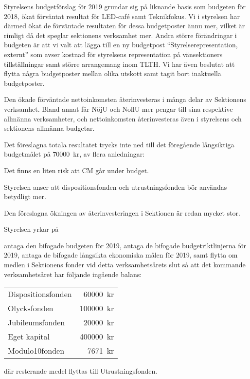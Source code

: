 \documentclass[../_main/handlingar.tex]{subfiles}
\begin{document}

Styrelsens budgetförslag för 2019 grundar sig på liknande basis som budgeten för 2018, ökat förväntat resultat för LED-café samt Teknikfokus. Vi i styrelsen har därmed ökat de förväntade resultaten för dessa budgetposter ännu mer, vilket är rimligt då det speglar sektionens verksamhet mer. Andra större förändringar i budgeten är att vi valt att lägga till en ny budgetpost ``Styrelserepresentation, externt'' som avser kostnad för styrelsens representation på vänsektioners tillställningar samt större arrangemang inom TLTH. Vi har även beslutat att flytta några budgetposter mellan olika utskott samt tagit bort inaktuella budgetposter. 

Den ökade förväntade nettoinkomsten återinvesteras i många delar av Sektionens verksamhet. Bland annat får NöjU och NollU mer pengar till sina respektive allmänna verksamheter, och nettoinkomsten återinvesteras även i styrelsens och sektionens allmänna budgetar.

Det föreslagna totala resultatet trycks inte ned till det föregående långsiktiga budgetmålet på \SI{70000}{kr}, av flera anledningar:
\begin{tightdashlist}
    \item Det finns en liten risk att CM går under budget.
    \item Styrelsen anser att dispositionsfonden och utrustningsfonden bör användas betydligt mer.
    \item Den föreslagna ökningen av återinvesteringen i Sektionen är redan mycket stor.
\end{tightdashlist}

Styrelsen yrkar på

\begin{attsatser}
    \att antaga den bifogade budgeten för 2019,
    \att antaga de bifogade budgetriktlinjerna för 2019,
    \att antaga de bifogade långsikta ekonomiska målen för 2019, samt
    \att flytta om medlen i Sektionens fonder vid detta verksamhetsårets slut så att det kommande verksamhetsåret har följande ingående balans:\par
    \begin{tabular}{l r}
        Dispositionsfonden & \SI{60000}{kr}\\
        Olycksfonden & \SI{100000}{kr}\\
        Jubileumsfonden & \SI{20000}{kr}\\
        Eget kapital & \SI{400000}{kr}\\
        Modulo10fonden & \SI{7671}{kr}\\
    \end{tabular}\par
    där resterande medel flyttas till Utrustningsfonden.
\end{attsatser}
\end{document}
